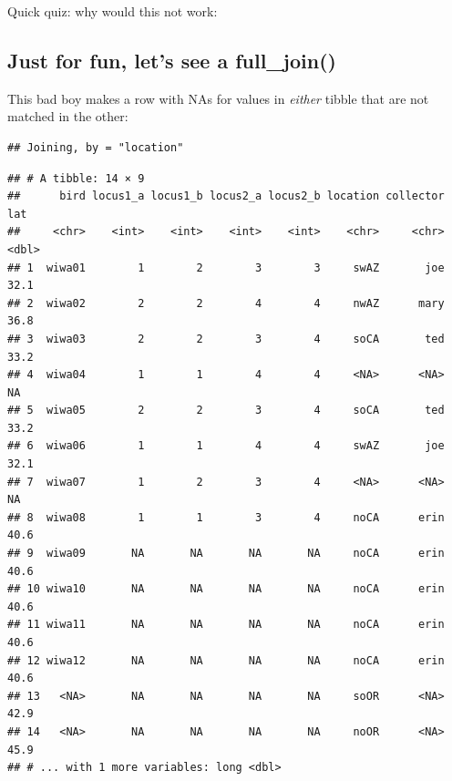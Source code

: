\documentclass[]{book}
\newenvironment{Shaded}{\begin{snugshade}}{\end{snugshade}}
\newcommand{\KeywordTok}[1]{\textcolor[rgb]{0.13,0.29,0.53}{\textbf{{#1}}}}
\newcommand{\DataTypeTok}[1]{\textcolor[rgb]{0.13,0.29,0.53}{{#1}}}
\newcommand{\DecValTok}[1]{\textcolor[rgb]{0.00,0.00,0.81}{{#1}}}
\newcommand{\StringTok}[1]{\textcolor[rgb]{0.31,0.60,0.02}{{#1}}}
\newcommand{\CommentTok}[1]{\textcolor[rgb]{0.56,0.35,0.01}{\textit{{#1}}}}
\newcommand{\NormalTok}[1]{{#1}}
\theoremstyle{definition}
\theoremstyle{definition}
\theoremstyle{remark}
\begin{document}
Quick quiz: why would this not work:

\begin{Shaded}
\end{Shaded}

\subsection{Just for fun, let's see a
full\_join()}\label{just-for-fun-lets-see-a-full_join}

This bad boy makes a row with NAs for values in \emph{either} tibble
that are not matched in the other:

\begin{Shaded}
\end{Shaded}

\begin{verbatim}
## Joining, by = "location"
\end{verbatim}

\begin{verbatim}
## # A tibble: 14 × 9
##      bird locus1_a locus1_b locus2_a locus2_b location collector   lat
##     <chr>    <int>    <int>    <int>    <int>    <chr>     <chr> <dbl>
## 1  wiwa01        1        2        3        3     swAZ       joe  32.1
## 2  wiwa02        2        2        4        4     nwAZ      mary  36.8
## 3  wiwa03        2        2        3        4     soCA       ted  33.2
## 4  wiwa04        1        1        4        4     <NA>      <NA>    NA
## 5  wiwa05        2        2        3        4     soCA       ted  33.2
## 6  wiwa06        1        1        4        4     swAZ       joe  32.1
## 7  wiwa07        1        2        3        4     <NA>      <NA>    NA
## 8  wiwa08        1        1        3        4     noCA      erin  40.6
## 9  wiwa09       NA       NA       NA       NA     noCA      erin  40.6
## 10 wiwa10       NA       NA       NA       NA     noCA      erin  40.6
## 11 wiwa11       NA       NA       NA       NA     noCA      erin  40.6
## 12 wiwa12       NA       NA       NA       NA     noCA      erin  40.6
## 13   <NA>       NA       NA       NA       NA     soOR      <NA>  42.9
## 14   <NA>       NA       NA       NA       NA     noOR      <NA>  45.9
## # ... with 1 more variables: long <dbl>
\end{verbatim}
\end{document}
